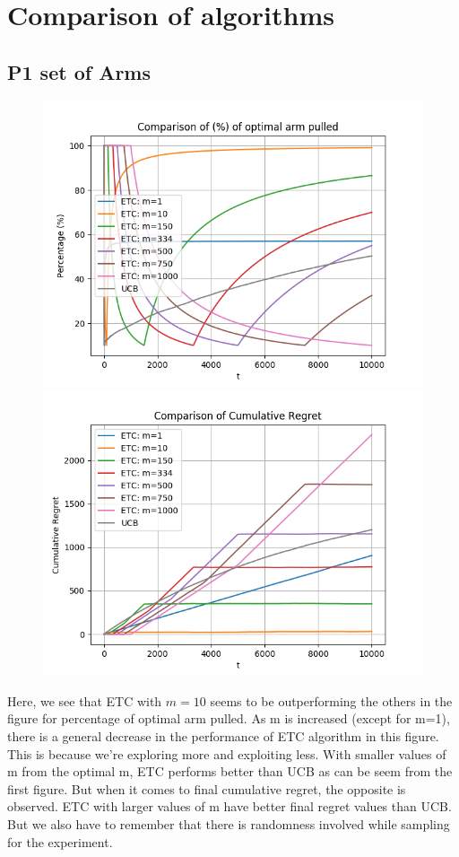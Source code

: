 \documentclass[12pt]{report}
\begin{document}
\section{Comparison of algorithms}
		\subsection{P1 set of Arms}
			\begin{figure}[H]
				\includegraphics[scale=0.8]{Figures/Combined_op_P1.png}
				\includegraphics[scale=0.8]{Figures/Combined_regret_P1.png}
			\end{figure}
		
		\noindent Here, we see that ETC with $m = 10$ seems to be outperforming the others in the figure for percentage of optimal arm pulled. As m is increased (except for m=1), there is a general decrease in the performance of ETC algorithm in this figure. This is because we're exploring more and exploiting less. With smaller values of m from the optimal m, ETC performs better than UCB as can be seem from the first figure. But when it comes to final cumulative regret, the opposite is observed. ETC with larger values of m have better final regret values than UCB. But we also have to remember that there is randomness involved while sampling for the experiment.
		
\end{document}
